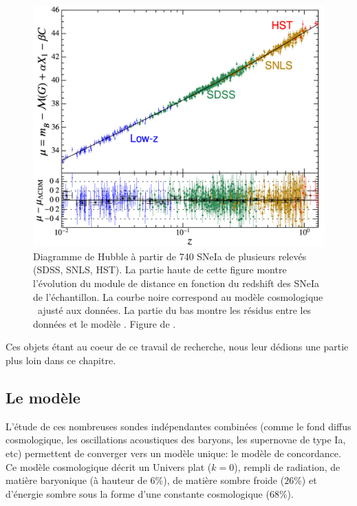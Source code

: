 \documentclass[../main/main.tex]{subfiles}
\begin{document}
\begin{figure}[ht]
  \begin{minipage}[c]{0.55\textwidth}
    \includegraphics[width=\textwidth]{../figures/01_cosmology/sneiabetoule.pdf}
  \end{minipage}\hfill
  \begin{minipage}[c]{0.42\textwidth}
    \caption[Diagramme de Hubble à partir de SNeIa de plusieurs relevés
    (SDSS, SNLS, HST)]{Diagramme de Hubble à partir de 740 SNeIa de plusieurs relevés
    (SDSS, SNLS, HST). La partie haute de cette figure montre
    l'évolution du module de distance en fonction du redshift
  des SNeIa de l'échantillon. La courbe noire correspond au modèle
  cosmologique \lcdm\ ajusté aux données. La partie du bas montre les résidus entre
  les données et le modèle \lcdm. Figure de \citet{Betoule2014}.}\label{fig:sneiabetoule}
  \end{minipage}
\end{figure}

Ces objets étant au coeur de ce travail de recherche, nous leur dédions une
partie plus loin dans ce chapitre. 


\subsection{Le modèle \lcdm}
L'étude de ces nombreuses sondes indépendantes combinées (comme le fond diffus
cosmologique, les oscillations acoustiques des baryons, les supernovae
de type Ia, etc) permettent de converger vers un modèle unique: le
modèle de concordance. Ce modèle cosmologique décrit un Univers plat
($k=0$), rempli de radiation, de  matière
baryonique (à hauteur de $6\%$), de matière sombre froide ($26\%$)
et d'énergie sombre sous la forme d'une constante cosmologique
($68\%$).
\end{document}
